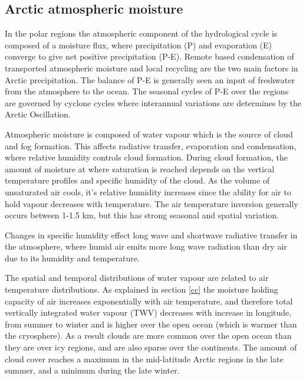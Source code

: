 \documentclass[12pt, oneside]{article}
\begin{document}
\subsection{Arctic atmospheric moisture}

In the polar regions the atmospheric component of the hydrological cycle is composed of a moisture flux, where precipitation (P) and evaporation (E) converge to give net positive precipitation (P-E). Remote based condensation of transported atmospheric moisture and local recycling are the two main factors in Arctic precipitation. The balance of P-E is generally seen an input of freshwater from the atmosphere to the ocean\cite{oshima2017atmospheric}. The seasonal cycles of P-E over the regions are governed by cyclone cycles where interannual variations are determines by the Arctic Oscillation. 


Atmospheric moisture is composed of water vapour which is the source of cloud and fog formation. This affects radiative transfer, evaporation and condensation, where relative humidity controls cloud formation. During cloud formation, the amount of moisture at where saturation is reached depends on the vertical temperature profiles and specific humidity of the cloud. As the volume of unsaturated air cools, it's relative humidity increases since the ability for air to hold vapour decreases with temperature. The air temperature inversion generally occurs between 1-1.5 km, but this has strong seasonal and spatial variation. 

Changes in specific humidity effect long wave and shortwave radiative transfer in the atmosphere, where humid air emits more long wave radiation than dry air due to its humidity and temperature. 


The spatial and temporal distributions of water vapour are related to air temperature distributions. As explained in section \ref{cc} the moisture holding capacity of air increases exponentially with air temperature, and therefore total vertically integrated water vapour (TWV) decreases with increase in longitude, from summer to winter and is higher over the open ocean (which is warmer than the cryosphere). As a result clouds are more common over the open ocean than they are over icy regions, and are also sparse over the continents. The amount of cloud cover reaches a maximum in the mid-latitude Arctic regions in the late summer, and a minimum during the late winter. 
\end{document}
